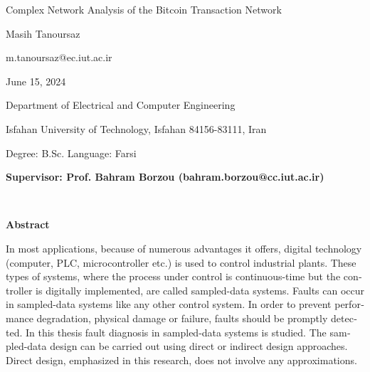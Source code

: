\thispagestyle{empty}

\begin{latin}
\begin{center}

{\Huge Complex Network Analysis of the Bitcoin Transaction Network}

\vspace{1cm}

{\LARGE{Masih Tanoursaz}}

\vspace{0.2cm}

{\small m.tanoursaz@ec.iut.ac.ir}

\vspace{0.5cm}

June 15, 2024

\vspace{0.5cm}

Department of Electrical and Computer Engineering

\vspace{0.2cm}

Isfahan University of Technology, Isfahan 84156-83111, Iran

\vspace{0.2cm}

Degree: B.Sc. \hspace*{3cm} Language: Farsi

\vspace{1cm}

{\small\textbf{Supervisor: Prof. Bahram Borzou (bahram.borzou@cc.iut.ac.ir)}}
\end{center}
~\vfill



\noindent\textbf{Abstract}

\begin{small}
\baselineskip=0.6cm
In most applications, because of numerous advantages it offers,
digital technology (computer, PLC, microcontroller etc.) is used to
control industrial plants. These types of systems, where the process
under control is continuous-time but the controller is digitally
implemented, are called sampled-data systems. Faults can occur in
sampled-data systems like any other control system. In order to
prevent performance degradation, physical damage or failure, faults
should be promptly detected. In this thesis fault diagnosis in
sampled-data systems is studied. The sampled-data design can be
carried out using direct or indirect design approaches. Direct
design, emphasized in this research, does not involve any
approximations.


\end{small}
\end{latin}
